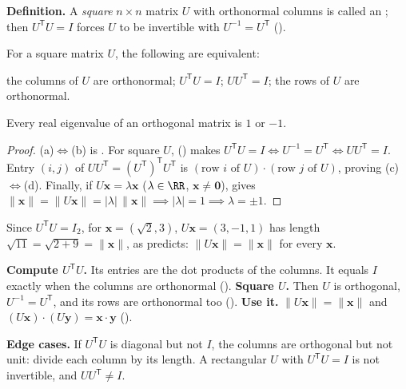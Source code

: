 \documentclass[10pt]{scrartcl}
\newcommand{\vv}[1]{\mathbf{#1}}
\newenvironment{howto}[1]{\begin{mdframed}[style=howtostyle,frametitle={#1}]}{\end{mdframed}}
\begin{document}
\noindent\textbf{Definition.} A \emph{square} $n\times n$ matrix $U$ with orthonormal columns is called an ; then $U^{\mathsf T}U=I$ forces $U$ to be invertible with $U^{-1}=U^{\mathsf T}$ ().

\begin{proposition*}
  For a square matrix $U$, the following are equivalent:
  \begin{enumerate}[(a)]
    \ii the columns of $U$ are orthonormal;
    \ii $U^{\mathsf T}U=I$;
    \ii $UU^{\mathsf T}=I$;
    \ii the rows of $U$ are orthonormal.
  \end{enumerate}
  Every real eigenvalue of an orthogonal matrix is $1$ or $-1$.
\end{proposition*}
\begin{proof}
  (a)$\Leftrightarrow$(b) is . For square $U$, () makes $U^{\mathsf T}U=I \iff U^{-1}=U^{\mathsf T} \iff UU^{\mathsf T}=I$. Entry $(i,j)$ of $UU^{\mathsf T}=(U^{\mathsf T})^{\mathsf T}U^{\mathsf T}$ is $(\text{row }i\text{ of }U)\cdot(\text{row }j\text{ of }U)$, proving (c)$\Leftrightarrow$(d). Finally, if $U\vv x=\lambda\vv x$ ($\lambda\in\RR$, $\vv x\neq\vv 0$),  gives $\|\vv x\|=\|U\vv x\|=|\lambda|\,\|\vv x\| \implies |\lambda|=1 \implies \lambda=\pm1$.
\end{proof}

\revisit Since $U^{\mathsf T}U=I_2$, for $\vv x=(\sqrt{2},3)$, $U\vv x=(3,-1,1)$ has length $\sqrt{11}=\sqrt{2+9}=\|\vv x\|$, as  predicts: $\|U\vv x\|=\|\vv x\|$ for every $\vv x$.

\begin{howto}{How to check that a matrix has orthonormal columns, and use it}
  \begin{steps}
    \ii \textbf{Compute $U^{\mathsf T}U$.} Its entries are the dot products of the columns. It equals $I$ exactly when the columns are orthonormal ().
    \ii \textbf{Square $U$.} Then $U$ is orthogonal, $U^{-1}=U^{\mathsf T}$, and its rows are orthonormal too ().
    \ii \textbf{Use it.} $\|U\vv x\|=\|\vv x\|$ and $(U\vv x)\cdot(U\vv y)=\vv x\cdot\vv y$ ().
  \end{steps}
  \textbf{Edge cases.} If $U^{\mathsf T}U$ is diagonal but not $I$, the columns are orthogonal but not unit: divide each column by its length. A rectangular $U$ with $U^{\mathsf T}U=I$ is not invertible, and $UU^{\mathsf T}\neq I$.
\end{howto}
\end{document}
